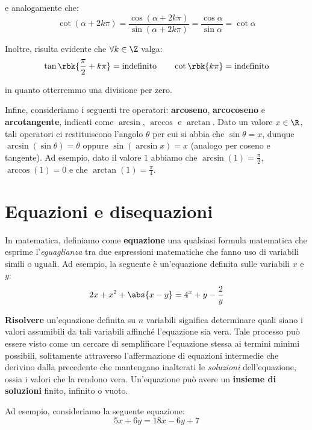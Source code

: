 \documentclass[a4paper, 12pt]{report}
\begin{document}
    e analogamente che:
    \[\cot(\alpha + 2k\pi) = \frac{\cos(\alpha +2k\pi)}{\sin(\alpha + 2k\pi)} = \frac{\cos \alpha}{\sin \alpha} = \cot \alpha\]

    Inoltre, risulta evidente che $\forall k \in \Z$ valga:
    \[\tan\rbk{\frac{\pi}{2}+k\pi} = \text{indefinito} \quad\quad \cot\rbk{k\pi} = \text{indefinito}\]

    in quanto otterremmo una divisione per zero.

    \newpage

    Infine, consideriamo i seguenti tre operatori: \textbf{arcoseno}, \textbf{arcocoseno} e \textbf{arcotangente}, indicati come $\arcsin$, $\arccos$ e $\arctan$. Dato un valore $x \in \R$, tali operatori ci restituiscono l'angolo $\theta$ per cui si abbia che $\sin \theta = x$, dunque $\arcsin(\sin \theta) = \theta$ oppure $\sin(\arcsin x) = x$ (analogo per coseno e tangente). Ad esempio, dato il valore $1$ abbiamo che $\arcsin(1) = \frac{\pi}{2}$,  $\arccos(1) = 0$ e che $\arctan(1) = \frac{\pi}{4}$.

    \quad

    \section{Equazioni e disequazioni}

    In matematica, definiamo come \textbf{equazione} una qualsiasi formula matematica che esprime l'\textit{eguaglianza} tra due espressioni matematiche che fanno uso di variabili simili o uguali. Ad esempio, la seguente è un'equazione definita sulle variabili $x$ e $y$:
    \[2x+x^2 + \abs{x-y} = 4^x+y-\frac{2}{y}\]

    \textbf{Risolvere} un'equazione definita su $n$ variabili significa determinare quali siano i valori assumibili da tali variabili affinché l'equazione sia vera. Tale processo può essere visto come un cercare di semplificare l'equazione stessa ai termini minimi possibili, solitamente attraverso l'affermazione di equazioni intermedie che derivino dalla precedente che mantengano inalterati le \textit{soluzioni} dell'equazione, ossia i valori che la rendono vera. Un'equazione può avere un \textbf{insieme di soluzioni} finito, infinito o vuoto.

    Ad esempio, consideriamo la seguente equazione:
    \[5x+6y = 18x-6y + 7\]
\end{document}
